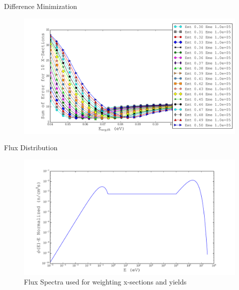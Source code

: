 \documentclass{beamer}
\begin{document}
\begin{frame}{Difference Minimization}
  \begin{figure}[H]
    \begin{center}
      \includegraphics[width=1.1\columnwidth]{../Weighting/Reduce_Err/E0_vs_SumErr_third.pdf}
      \vspace{-5mm}
      \label{fig:err}
    \end{center}
  \end{figure}
\end{frame}

\begin{frame}{Flux Distribution}
  \begin{figure}[H]
    \begin{center}
      \includegraphics[width=1.1\columnwidth]{../Weighting/Flux_Spectra.pdf}
      \vspace{-5mm}
      \caption{Flux Spectra used for weighting x-sections and yields}
      \label{fig:Flux}
    \end{center}
  \end{figure}
\end{frame}
\end{document}
